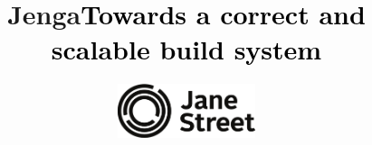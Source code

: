 \documentclass{beamer}
\begin{document}
\title{\Huge{\bf Jenga}\vskip24pt\large\textcolor{black}{Towards a correct and scalable build system}}
\date{
\includegraphics[width=4cm]{new-jane-street-logo.pdf}
}



\let\oldframetitle\frametitle
\renewcommand{\frametitle}[1]{%
  \oldframetitle{\vskip4pt\hskip4pt#1}\setstretch{1.4}}

\newcommand\gdb{{\tt gdb}}
\newcommand\gap{\vskip18pt}
\newcommand\highlight[1]{\colorbox{orange}{\textcolor{black}{#1}}}

\begin{frame}
\titlepage
\end{frame}




\end{document}
